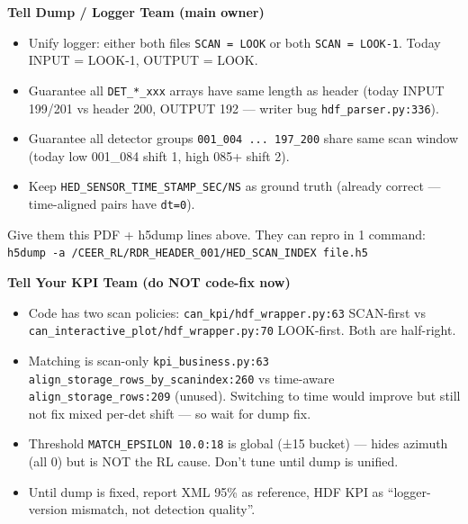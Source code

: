 \documentclass[11pt,a4paper]{article}
\begin{document}
\vspace{1mm}
\begin{tcolorbox}[colback=white,colframe=good,arc=2mm,boxsep=2mm,title=\textbf{Who should fix what — do NOT change your KPI code yet}]
\begin{minipage}[t]{0.48\textwidth}
\scriptsize
\textcolor{good}{\textbf{Tell Dump / Logger Team (main owner)}}\\[1mm]
\begin{itemize}[leftmargin=4mm,itemsep=1mm]
  \item Unify logger: either both files \texttt{SCAN = LOOK} or both \texttt{SCAN = LOOK-1}. Today INPUT = LOOK-1, OUTPUT = LOOK.
  \item Guarantee all \texttt{DET\_*\_xxx} arrays have same length as header (today INPUT 199/201 vs header 200, OUTPUT 192 — writer bug \texttt{hdf\_parser.py:336}).
  \item Guarantee all detector groups \texttt{001\_004 ... 197\_200} share same scan window (today low 001\_084 shift 1, high 085+ shift 2).
  \item Keep \texttt{HED\_SENSOR\_TIME\_STAMP\_SEC/NS} as ground truth (already correct — time-aligned pairs have \texttt{dt=0}).
\end{itemize}
\textcolor{midGray}{Give them this PDF + h5dump lines above. They can repro in 1 command: \texttt{h5dump -a /CEER\_RL/RDR\_HEADER\_001/HED\_SCAN\_INDEX file.h5}}
\end{minipage}
\hfill
\begin{minipage}[t]{0.48\textwidth}
\scriptsize
\textcolor{warn}{\textbf{Tell Your KPI Team (do NOT code-fix now)}}\\[1mm]
\begin{itemize}[leftmargin=4mm,itemsep=1mm]
  \item Code has two scan policies: \texttt{can\_kpi/hdf\_wrapper.py:63} SCAN-first vs \texttt{can\_interactive\_plot/hdf\_wrapper.py:70} LOOK-first. Both are half-right.
  \item Matching is scan-only \texttt{kpi\_business.py:63} \texttt{align\_storage\_rows\_by\_scanindex:260} vs time-aware \texttt{align\_storage\_rows:209} (unused). Switching to time would improve but still not fix mixed per-det shift — so wait for dump fix.
  \item Threshold \texttt{MATCH\_EPSILON 10.0:18} is global (±15 bucket) — hides azimuth (all 0) but is NOT the RL cause. Don't tune until dump is unified.
  \item Until dump is fixed, report XML 95\% as reference, HDF KPI as “logger-version mismatch, not detection quality”.
\end{itemize}
\end{minipage}
\end{tcolorbox}
\end{document}
